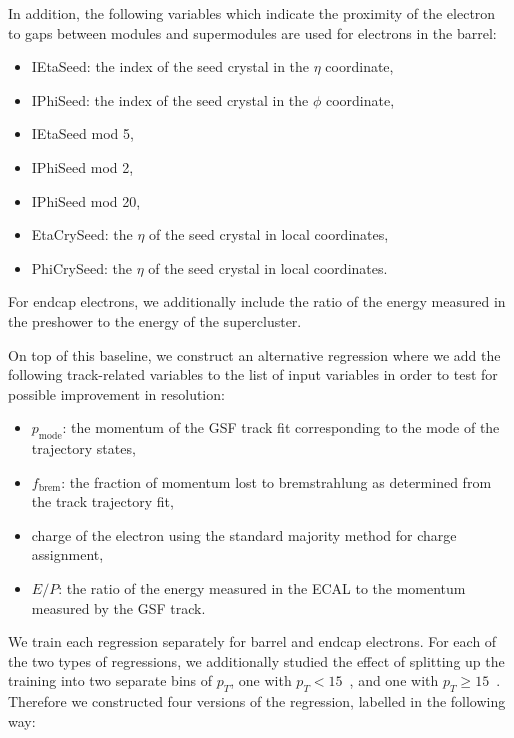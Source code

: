 \documentclass{cmspaper}
\begin{document}
In addition, the following variables which indicate the proximity of the electron to gaps between modules and supermodules 
are used for electrons in the barrel:
\begin{itemize}
\item IEtaSeed: the index of the seed crystal in the $\eta$ coordinate,
\item IPhiSeed: the index of the seed crystal in the $\phi$ coordinate, 
\item IEtaSeed mod 5,
\item IPhiSeed mod 2,
\item IPhiSeed mod 20,
\item EtaCrySeed: the $\eta$ of the seed crystal in local coordinates,
\item PhiCrySeed: the $\eta$ of the seed crystal in local coordinates.
\end{itemize} 

For endcap electrons, we additionally include the ratio of the energy measured in the preshower to the 
energy of the supercluster.

On top of this baseline, we construct an alternative regression where we 
add the following track-related variables to the list of input variables in order to test for
possible improvement in resolution:

\begin{itemize}
\item $p_{\mathrm{mode}}$: the momentum of the GSF track fit corresponding to the mode of the trajectory states,
\item $f_{\mathrm{brem}}$: the fraction of momentum lost to bremstrahlung as determined from the track trajectory fit,
\item charge of the electron using the standard majority method for charge assignment,
\item $E/P$: the ratio of the energy measured in the ECAL to the momentum measured by the GSF track.
\end{itemize}

We train each regression separately for barrel and endcap electrons. For each of the 
two types of regressions, we additionally studied the effect of splitting up 
the training into two separate bins of $p_{T}$, one with $p_{T} < 15$~\GeV, and one with
$p_{T} \ge 15$~\GeV. Therefore we constructed four versions of the regression, labelled 
in the following way:
\end{document}

